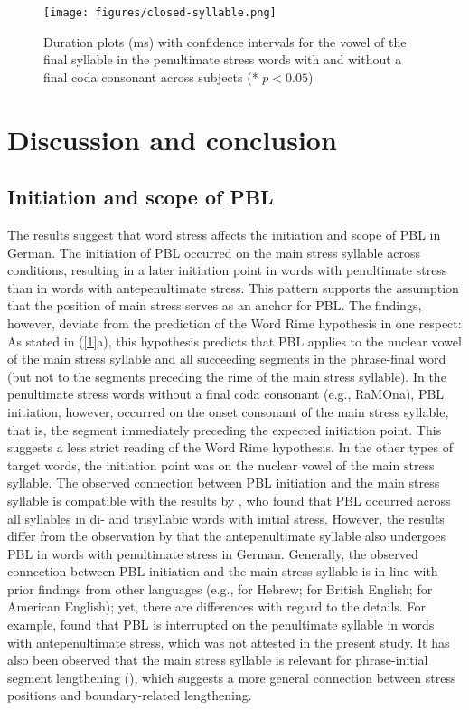 \documentclass[output=paper]{langscibook}
\begin{document}
\begin{figure}
    \texttt{[image: figures/closed-syllable.png]}
    \caption{Duration plots (ms) with confidence intervals for the vowel of the final syllable in the penultimate
stress words with and without a final coda consonant across subjects (* $p<0.05$)\label{fig:closed_syllable}}
\end{figure}

\section{Discussion and conclusion}\label{discussion}
\subsection{Initiation and scope of PBL}
The results suggest that word stress affects the initiation and scope of PBL in German. The initiation of PBL occurred on the main stress syllable across conditions, resulting in a later initiation point in words with penultimate stress than in words with antepenultimate stress. This pattern supports the assumption that the position of main stress serves as an anchor for PBL. The findings, however, deviate from the prediction of the Word Rime hypothesis in one respect: As stated in (\ref{1}a), this hypothesis predicts that PBL applies to the nuclear vowel of the main stress syllable and all succeeding segments in the phrase-final word (but not to the segments preceding the rime of the main stress syllable). In the penultimate stress words without a final coda consonant (e.g., RaMOna), PBL initiation, however, occurred on the onset consonant of the main stress syllable, that is, the segment immediately preceding the expected initiation point. This suggests a less strict reading of the Word Rime hypothesis. In the other types of target words, the initiation point was on the nuclear vowel of the main stress syllable. The observed connection between PBL initiation and the main stress syllable is compatible with the results by \citet{Kohler1983}, who found that PBL occurred across all syllables in di- and trisyllabic words with initial stress. However, the results differ from the observation by \citet{Silverman1990} that the antepenultimate syllable also undergoes PBL in words with penultimate stress in German. Generally, the observed connection between PBL initiation and the main stress syllable is in line with prior findings from other languages (e.g., \citealt{Berkovits1994} for Hebrew; \citealt{White2002} for British English; \citealt{TurkShattuck-Hufnagel2007} for American English); yet, there are differences with regard to the details. For example, \citet{TurkShattuck-Hufnagel2007} found that PBL is interrupted on the penultimate syllable in words with antepenultimate stress, which was not attested in the present study. It has also been observed that the main stress syllable is relevant for phrase-initial segment lengthening (), which suggests a more general connection between stress positions and boundary-related lengthening.
\end{document}
